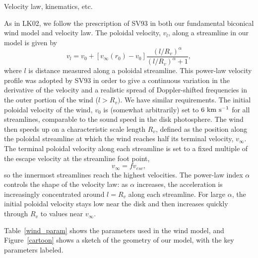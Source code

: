 \documentclass[useAMS,usenatbib, onecolumn]{mn2ejm}
\begin{document}
Velocity law, kinematics, etc.

As in LK02, we follow the prescription of SV93 in both our fundamental biconical wind model and velocity law. 
The poloidal velocity, $v_l$, along a streamline in our model is given
by 
\begin{equation}
v_l=v_0+\left[v_{\infty}(r_0)-v_0\right]\frac{\left(l/R_v\right)^{\alpha}}{\left(l/R_v\right)^{\alpha}+1},
\label{v_law}
\end{equation}
where $l$ is distance measured along a poloidal streamline. This
power-law velocity profile was adopted by SV93 in order to give a 
continuous variation in the derivative of the velocity and a 
realistic spread of Doppler-shifted frequencies in the outer portion
of the wind (${l > R_v})$. We have similar requirements.
The initial poloidal velocity of the wind, $v_0$ is (somewhat
arbitrarily) set to $6~\rm{km~s^{-1}}$ for all streamlines, comparable
to the sound speed in the disk photosphere. The
wind then speeds up on a characteristic scale length $R_v$, 
defined as the position along the poloidal streamline at which the
wind reaches half its terminal velocity, $v_{\infty}$.
The terminal poloidal velocity along each streamline is set to a fixed
multiple of the escape velocity at the streamline foot point, 
\begin{equation}
v_{\infty}=fv_{esc},
\label{v_infty}
\end{equation}
so the
innermost streamlines reach the highest velocities.
The power-law index $\alpha$ controls the shape of the velocity
law: as $\alpha$ increases, the acceleration is increasingly
concentrated around $l = R_v$ along each streamline. 
For large $\alpha$, the initial poloidal velocity
stays low near the disk and then increases quickly through $R_v$ to 
values near $v_\infty$. 

Table~\ref{wind_param} shows the parameters used in the wind model, and Figure~\ref{cartoon}
shows a sketch of the geometry of our model, with the key parameters labeled.
\end{document}
